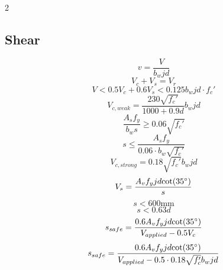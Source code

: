 \documentclass[14pt]{article}
\begin{document}
\begin{multicols}{2}
    \subsection{Shear}
    \begin{equation}
        v=\frac{V}{b_wjd}
    \end{equation}
    \begin{equation}
        V_c + V_s = V_r 
    \end{equation}
    \begin{equation}
        V<0.5V_c+0.6V_s<0.125 b_wjd \cdot f_c'
    \end{equation}
    \begin{equation}
        V_{c, weak}=\frac{230\sqrt{f_c'}}{1000+0.9d}b_wjd
    \end{equation}
    \begin{equation}
        \frac{A_s f_y}{b_ws}\geq 0.06 \sqrt{f_c'}
    \end{equation}
    \begin{equation}
        s\leq\frac{A_sf_y}{0.06\cdot b_w \sqrt{f_c'}}
    \end{equation}
    \begin{equation}
        V_{c, strong}=0.18\sqrt{f_c'}b_wjd
    \end{equation}
    \begin{equation}
        V_s=\frac{A_v f_y jd \text{cot}(35\degree)}{s}
    \end{equation}
    \begin{equation}
        s<600\text{mm}
    \end{equation}
    \begin{equation}
        s<0.63d
    \end{equation}
    \begin{equation}
    s_{safe}=\frac{0.6A_vf_yjd\text{cot} (35\degree)}{V_{applied}-0.5V_c}
    \end{equation}
    \begin{equation} s_{safe}=\frac{0.6A_vf_yjd\text{cot}(35\degree)}{V_{applied}-0.5\cdot 0.18\sqrt{f_c'}b_wjd}
    \end{equation}
    
    


\end{multicols}
\end{document}
